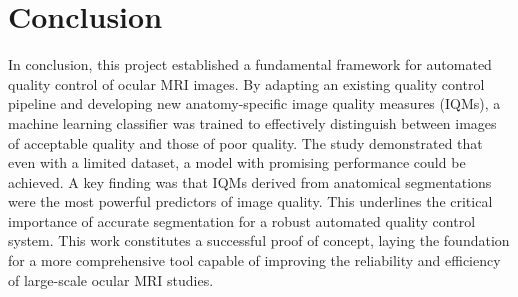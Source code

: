 \chapter{Conclusion}
\label{chap:conclusion}

In conclusion, this project established a fundamental framework for automated quality control of ocular MRI images. By adapting an existing quality control pipeline and developing new anatomy-specific image quality measures (IQMs), a machine learning classifier was trained to effectively distinguish between images of acceptable quality and those of poor quality. The study demonstrated that even with a limited dataset, a model with promising performance could be achieved. A key finding was that IQMs derived from anatomical segmentations were the most powerful predictors of image quality. This underlines the critical importance of accurate segmentation for a robust automated quality control system. This work constitutes a successful proof of concept, laying the foundation for a more comprehensive tool capable of improving the reliability and efficiency of large-scale ocular MRI studies.




